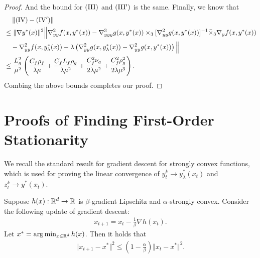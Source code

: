\begin{proof}
And the bound for ${\rm(III)}$ and $ {\rm (III')}$ is the same. Finally, we know that
\begin{align*}
    &\quad \left \Vert {\rm (IV)} - {\rm (IV')} \right \Vert \\
    &\le \Vert \nabla y^*(x) \Vert^2 \Big \Vert \nabla_{yy}^2 f(x,y^*(x)) - \nabla_{yyy}^3 g(x,y^*(x)) \times_3 [ \nabla_{yy}^2 g(x,y^*(x))]^{-1} \bar \times_3 \nabla_y f(x,y^*(x))  \\
    &\quad - \nabla_{yy}^2 f(x,y_{\lambda}^*(x)) - \lambda \left( \nabla_{yy}^2 g(x,y_{\lambda}^*(x)) - \nabla_{yy}^2 g(x,y^*(x)) \right) \Big \Vert \\
    &\le \frac{L_g^2}{\mu^2} \left( \frac{C_f \rho_f}{\lambda \mu} + \frac{C_f L_f \rho_g}{\lambda \mu^2}  + \frac{C_f^2 \nu_g}{2\lambda \mu^2} +  \frac{C_f^2 \rho_g^2}{2 \lambda \mu^3}\right).
\end{align*}
Combing the above bounds completes our proof.
\end{proof}

\section{Proofs of Finding First-Order Stationarity} \label{apx:1st}

We recall the standard result for gradient descent for strongly convex functions, which is used for proving the linear convergence of $y_t^k \rightarrow y_{\lambda}^*(x_t) $ and $z_{t}^k \rightarrow y^*(x_t)$.
\begin{thm} \label{thm:GD-SC}
Suppose $h(x): {\mathbb{R}}^d \rightarrow {\mathbb{R}}$ is  $\beta$-gradient Lipschitz and $\alpha$-strongly convex. Consider the following update of gradient descent:
\begin{align*}
    x_{t+1} = x_t - \frac{1}{\beta} \nabla h(x_t).
\end{align*}
Let $x^* = \arg \min_{x \in {\mathbb{R}}^d} h(x)$. Then it holds that
\begin{align*}
    \Vert x_{t+1} - x^* \Vert^2 \le \left(1 - \frac{\alpha}{\beta} \right) \Vert x_t - x^* \Vert^2.
\end{align*}
\end{thm}


